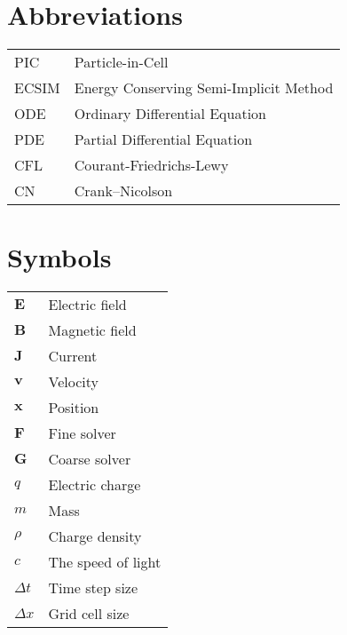 \documentclass[master=wit, english]{kulemt}
\begin{document}
\section*{Abbreviations}
\begin{flushleft}
  \renewcommand{\arraystretch}{1.1}
  \begin{tabularx}{\textwidth}{@{}p{12mm}X@{}}
  	PIC & Particle-in-Cell\\
    ECSIM   & Energy Conserving Semi-Implicit Method \cite{lapenta_exactly_2017}\\
    ODE & Ordinary Differential Equation\\
    PDE & Partial Differential Equation\\
    CFL  & Courant-Friedrichs-Lewy \cite{courant_uber_1928} \\
    CN & Crank--Nicolson \cite{Crank_Nicolson_1947} 
  \end{tabularx}
\end{flushleft}
\section*{Symbols}
\begin{flushleft}
  \renewcommand{\arraystretch}{1.1}
  \begin{tabularx}{\textwidth}{@{}p{12mm}X@{}}
    $\textbf{E}$    & Electric field \\
    $\textbf{B}$   & Magnetic field \\
    $\textbf{J}$ & Current\\
    $\textbf{v}$   & Velocity \\
    $\textbf{x}$   & Position \\
    $\textbf{F}$ & Fine solver \\
    $\textbf{G}$ & Coarse solver \\
    $q$ & Electric charge\\
    $m$ & Mass\\
    $\rho$ & Charge density\\
    $c$ & The speed of light\\
    $\Delta t$ & Time step size\\
    $\Delta x$ & Grid cell size\\

    
  \end{tabularx}
\end{flushleft}
\end{document}
